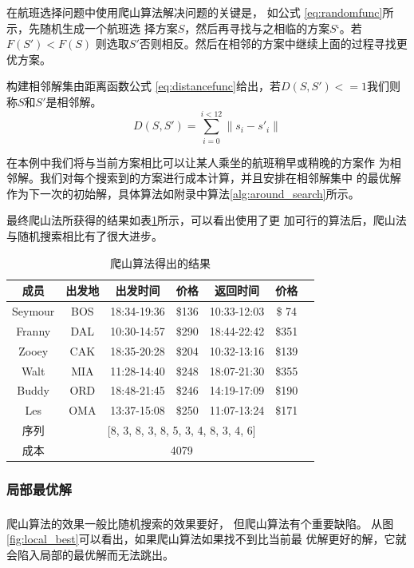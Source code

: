 \documentclass[fontset=fandol,a4paper,zihao=5]{ctexart}
\newcommand{\upcite}[1]{\textsuperscript{\textsuperscript{\cite{#1}}}}
\renewcommand{\eqref}[1]{公式 \ref{#1}}
\begin{document}
            在航班选择问题中使用爬山算法解决问题的关键是，
            如\eqref{eq:randomfunc}所示，先随机生成一个航班选
            择方案$S$，然后再寻找与之相临的方案$S‘$。若$F(S')<F(S)$
            则选取$S'$否则相反。然后在相邻的方案中继续上面的过程寻找更优方案。

            构建相邻解集由距离函数\eqref{eq:distancefunc}给出，若$D(S,S')<=1$我们则
            称$S$和$S'$是相邻解。
            \begin{equation}
                D(S,S') = \sum_{i=0}^{i<12}\|s_{i}-s'_{i}\|
                \label{eq:distancefunc}
            \end{equation}
			
			在本例中我们将与当前方案相比可以让某人乘坐的航班稍早或稍晚的方案作
            为相邻解。我们对每个搜索到的方案进行成本计算，并且安排在相邻解集中
            的最优解作为下一次的初始解，具体算法如附录中算法\ref{alg:around_search}所示。

			最终爬山法所获得的结果如表\ref{tab:hillclimb}所示，可以看出使用了更
            加可行的算法后，爬山法与随机搜索相比有了很大进步。

			\begin{table}[!htbp]
			\centering
			\caption{爬山算法得出的结果}
			\label{tab:hillclimb}
			\begin{tabular}{ccccccc}
				\toprule[1pt]
				成员     & 出发地& 出发时间    &  价格  &  返回时间    &   价格 \\
				\midrule
				Seymour   &    BOS & 18:34-19:36 & \$136 & 10:33-12:03 & \$ 74 \\
				Franny    &   DAL & 10:30-14:57 & \$290 & 18:44-22:42 & \$351 \\
				Zooey     &  CAK & 18:35-20:28 & \$204 & 10:32-13:16 & \$139 \\
				Walt      & MIA & 11:28-14:40 & \$248 & 18:07-21:30 & \$355 \\
				Buddy     &  ORD & 18:48-21:45 & \$246 & 14:19-17:09 & \$190 \\
				Les       & OMA & 13:37-15:08 & \$250 & 11:07-13:24 & \$171 \\	
				\midrule
				序列    & \multicolumn{5}{c}{[8, 3, 8, 3, 8, 5, 3, 4, 8, 3, 4, 6]} \\
				成本    & \multicolumn{5}{c}{4079} \\
				\bottomrule[1pt]
			\end{tabular} 
			\end{table}
			

			\subsubsection{局部最优解}
			爬山算法的效果一般比随机搜索的效果要好，
            但爬山算法有个重要缺陷\upcite{Xiao2004A}。
            从图\ref{fig:local_best}可以看出，如果爬山算法如果找不到比当前最
            优解更好的解，它就会陷入局部的最优解而无法跳出。
\end{document}
